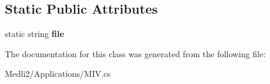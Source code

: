 \subsection*{Static Public Attributes}
\begin{DoxyCompactItemize}
\item 
\mbox{\label{class_medli_1_1_applications_1_1_m_i_v_a8c2fb81343851bba21733aaf76d6938c}} 
static string {\bfseries file}
\end{DoxyCompactItemize}


The documentation for this class was generated from the following file\+:\begin{DoxyCompactItemize}
\item 
Medli2/\+Applications/M\+I\+V.\+cs\end{DoxyCompactItemize}
